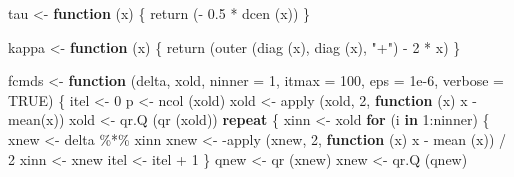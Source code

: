 \documentclass[
  12pt,
]{book}
\newenvironment{Shaded}{\begin{snugshade}}{\end{snugshade}}
\newcommand{\AttributeTok}[1]{\textcolor[rgb]{0.77,0.63,0.00}{#1}}
\newcommand{\ConstantTok}[1]{\textcolor[rgb]{0.00,0.00,0.00}{#1}}
\newcommand{\ControlFlowTok}[1]{\textcolor[rgb]{0.13,0.29,0.53}{\textbf{#1}}}
\newcommand{\DecValTok}[1]{\textcolor[rgb]{0.00,0.00,0.81}{#1}}
\newcommand{\FloatTok}[1]{\textcolor[rgb]{0.00,0.00,0.81}{#1}}
\newcommand{\FunctionTok}[1]{\textcolor[rgb]{0.00,0.00,0.00}{#1}}
\newcommand{\NormalTok}[1]{#1}
\newcommand{\OtherTok}[1]{\textcolor[rgb]{0.56,0.35,0.01}{#1}}
\newcommand{\SpecialCharTok}[1]{\textcolor[rgb]{0.00,0.00,0.00}{#1}}
\newcommand{\StringTok}[1]{\textcolor[rgb]{0.31,0.60,0.02}{#1}}
\theoremstyle{definition}
\theoremstyle{definition}
\theoremstyle{definition}
\theoremstyle{definition}
\theoremstyle{remark}
\begin{document}
\begin{Shaded}
\begin{Highlighting}[]
\NormalTok{tau }\OtherTok{\textless{}{-}} \ControlFlowTok{function}\NormalTok{ (x) \{}
  \FunctionTok{return}\NormalTok{ (}\SpecialCharTok{{-}} \FloatTok{0.5} \SpecialCharTok{*} \FunctionTok{dcen}\NormalTok{ (x))}
\NormalTok{\}}

\NormalTok{kappa }\OtherTok{\textless{}{-}} \ControlFlowTok{function}\NormalTok{ (x) \{}
  \FunctionTok{return}\NormalTok{ (}\FunctionTok{outer}\NormalTok{ (}\FunctionTok{diag}\NormalTok{ (x), }\FunctionTok{diag}\NormalTok{ (x), }\StringTok{"+"}\NormalTok{) }\SpecialCharTok{{-}} \DecValTok{2} \SpecialCharTok{*}\NormalTok{ x)}
\NormalTok{\}}

\NormalTok{fcmds }\OtherTok{\textless{}{-}}
  \ControlFlowTok{function}\NormalTok{ (delta,}
\NormalTok{            xold,}
            \AttributeTok{ninner =} \DecValTok{1}\NormalTok{,}
            \AttributeTok{itmax =} \DecValTok{100}\NormalTok{,}
            \AttributeTok{eps =} \FloatTok{1e{-}6}\NormalTok{,}
            \AttributeTok{verbose =} \ConstantTok{TRUE}\NormalTok{) \{}
\NormalTok{    itel }\OtherTok{\textless{}{-}} \DecValTok{0}
\NormalTok{    p }\OtherTok{\textless{}{-}} \FunctionTok{ncol}\NormalTok{ (xold)}
\NormalTok{    xold }\OtherTok{\textless{}{-}} \FunctionTok{apply}\NormalTok{ (xold, }\DecValTok{2}\NormalTok{, }\ControlFlowTok{function}\NormalTok{ (x)}
\NormalTok{      x }\SpecialCharTok{{-}} \FunctionTok{mean}\NormalTok{(x))}
\NormalTok{    xold }\OtherTok{\textless{}{-}} \FunctionTok{qr.Q}\NormalTok{ (}\FunctionTok{qr}\NormalTok{ (xold))}
    \ControlFlowTok{repeat}\NormalTok{ \{}
\NormalTok{      xinn }\OtherTok{\textless{}{-}}\NormalTok{ xold}
      \ControlFlowTok{for}\NormalTok{ (i }\ControlFlowTok{in} \DecValTok{1}\SpecialCharTok{:}\NormalTok{ninner) \{}
\NormalTok{        xnew }\OtherTok{\textless{}{-}}\NormalTok{ delta }\SpecialCharTok{\%*\%}\NormalTok{ xinn}
\NormalTok{        xnew }\OtherTok{\textless{}{-}} \SpecialCharTok{{-}}\FunctionTok{apply}\NormalTok{ (xnew, }\DecValTok{2}\NormalTok{, }\ControlFlowTok{function}\NormalTok{ (x)}
\NormalTok{          x }\SpecialCharTok{{-}} \FunctionTok{mean}\NormalTok{ (x)) }\SpecialCharTok{/} \DecValTok{2}
\NormalTok{        xinn }\OtherTok{\textless{}{-}}\NormalTok{ xnew}
\NormalTok{        itel }\OtherTok{\textless{}{-}}\NormalTok{ itel }\SpecialCharTok{+} \DecValTok{1}
\NormalTok{      \}}
\NormalTok{      qnew }\OtherTok{\textless{}{-}} \FunctionTok{qr}\NormalTok{ (xnew)}
\NormalTok{      xnew }\OtherTok{\textless{}{-}} \FunctionTok{qr.Q}\NormalTok{ (qnew)}

\end{Highlighting}
\end{Shaded}
\end{document}
